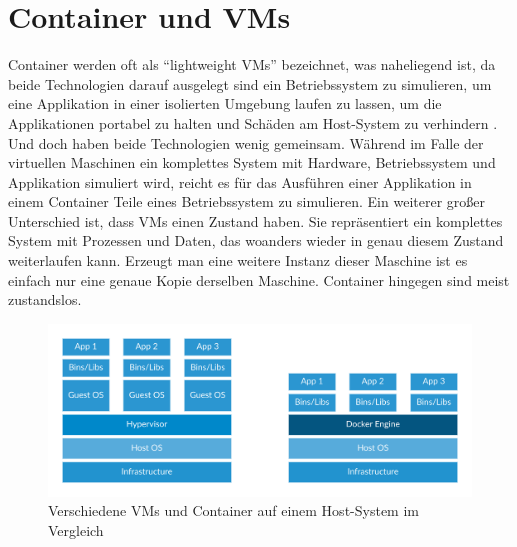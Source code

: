 \chapter{Container und VMs}

Container werden oft als “lightweight VMs” bezeichnet, was naheliegend ist, da beide Technologien darauf ausgelegt sind ein Betriebssystem zu simulieren, um eine Applikation in einer isolierten Umgebung laufen zu lassen, um die Applikationen portabel zu halten und Schäden am Host-System zu verhindern \cite{docker:cvsvm}.
Und doch haben beide Technologien wenig gemeinsam. Während im Falle der virtuellen Maschinen ein komplettes System mit Hardware, Betriebssystem und Applikation simuliert wird, reicht es für das Ausführen einer Applikation in einem Container Teile eines Betriebssystem zu simulieren.
Ein weiterer großer Unterschied ist, dass VMs einen Zustand haben. Sie repräsentiert ein komplettes System mit Prozessen und Daten, das woanders wieder in genau diesem Zustand weiterlaufen kann. Erzeugt man eine weitere Instanz dieser Maschine ist es einfach nur eine genaue Kopie derselben Maschine. Container hingegen sind meist zustandslos.\\

\begin{figure}[!ht]
  \centering
  \includegraphics[width=1\textwidth]{images/6-container-vm.png}
  \caption{Verschiedene VMs und Container auf einem Host-System im Vergleich \cite{docker}}
\end{figure}


